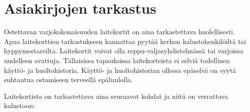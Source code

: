 \section{ Asiakirjojen tarkastus }
\label{kaluston-tarkastus-ja-huolto-asiakirjojen-tarkastus}


Ostettavan varjokokonaisuuden laitekortit on aina tarkastettava huolellisesti. Apua laitekorttien tarkastukseen kannattaa pyytää kerhon kalustohenkilöiltä tai hyppymestareilta. Laitekortit voivat olla reppu-valjasyhdistelmässä tai varjoissa uudelleen avattuja. Tällaisissa tapauksissa laitekorteista ei selviä todellinen käyttö- ja huoltohistoria. Käyttö- ja huoltohistorian ollessa epäselvä on syytä suhtautua ostamiseen terveellä epäluulolla. 


Laitekortista on tarkastettava aina seuraavat kohdat ja niitä on verrattava kalustoon: 

